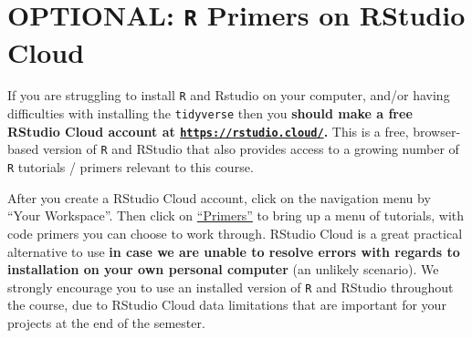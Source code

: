 \documentclass[
]{article}
\begin{document}
\hypertarget{optional-r-primers-on-rstudio-cloud}{%
\section{\texorpdfstring{OPTIONAL: \texttt{R} Primers on RStudio
Cloud}{OPTIONAL: R Primers on RStudio Cloud}}\label{optional-r-primers-on-rstudio-cloud}}

If you are struggling to install \texttt{R} and Rstudio on your
computer, and/or having difficulties with installing the
\texttt{tidyverse} then you \textbf{should make a free RStudio Cloud
account at
\href{https://rstudio.cloud/}{\texttt{https://rstudio.cloud/}}.} This is
a free, browser-based version of \texttt{R} and RStudio that also
provides access to a growing number of \texttt{R} tutorials / primers
relevant to this course.

After you create a RStudio Cloud account, click on the navigation menu
by ``Your Workspace''. Then click on
\href{https://rstudio.cloud/learn/primers}{``Primers''} to bring up a
menu of tutorials, with code primers you can choose to work through.
RStudio Cloud is a great practical alternative to use \textbf{in case we
are unable to resolve errors with regards to installation on your own
personal computer} (an unlikely scenario). We strongly encourage you to
use an installed version of \texttt{R} and RStudio throughout the
course, due to RStudio Cloud data limitations that are important for
your projects at the end of the semester.
\end{document}
